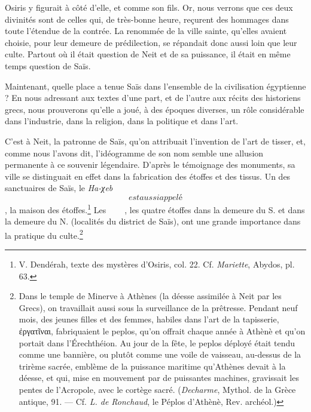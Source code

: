 \documentclass[letterpaper,twocolumn,openany,nodeprecatedcode]{dndbook}
\newcommand*\hieroAAAU{}
\newcommand*\hieroAAAX{}
\newcommand*\hieroAADR{}
\newcommand*\hieroAADV{\raisebox{0.5ex}{}}
\newcommand*\hieroAAFW{}
\newcommand*\hieroAAFX{}
\newcommand*\hieroAAFY{}
\newcommand*\hieroAAFZ{\raisebox{0.5ex}{}}
\newcommand*\hieroAAGA{}
\newcommand*\hieroAAGB{}
\begin{document}
Osiris y figurait à côté d'elle, et comme son fils. Or, nous verrons que ces deux divinités sont de celles qui, de très-bonne heure, reçurent des hommages dans toute l'étendue de la contrée. La renommée de la ville sainte, qu'elles avaient choisie, pour leur demeure de prédilection, se répandait donc aussi loin que leur culte. Partout où il était question de Neit et de sa puissance, il était en même temps question de Saïs.

Maintenant, quelle place a tenue Saïs dans l'ensemble de la civilisation égyptienne ? En nous adressant aux textes d'une part, et de l'autre aux récits des historiens grecs, nous prouverons qu'elle a joué, à des époques diverses, un rôle considérable dans l'industrie, dans la religion, dans la politique et dans l'art.

C'est à Neit, la patronne de Saïs, qu'on attribuait l'invention de l'art de tisser, et, comme nous l'avons dit, l'idéogramme de son nom semble une allusion permanente à ce souvenir légendaire. D'après le témoignage des monuments, sa ville se distinguait en effet dans la fabrication des étoffes et des tissus. Un des sanctuaires de Saïs, le \emph{Ha-χeb} $\hieroAAFW$ est aussi appelé $\hieroAAFX$, la maison des étoffes.\footnote{V. Dendérah, texte des mystères d'Osiris, col. 22. Cf. \emph{Mariette}, Abydos, pl. 63.} Les $\hieroAAFY\:\hieroAAFZ\:\hieroAAGA\allowbreak\:\hieroAADV\:\hieroAAAX\:\hieroAADR\allowbreak\:\hieroAAAU\:\hieroAAGB\:\hieroAAAU$, les quatre étoffes dans la demeure du S. et dans la demeure du N. (localités du district de Saïs), ont une grande importance dans la pratique du culte.\footnote{Dans le temple de Minerve à Athènes (la déesse assimilée à Neit par les Grecs), on travaillait aussi sous la surveillance de la prêtresse. Pendant neuf mois, des jeunes filles et des femmes, habiles dans l'art de la tapisserie, ἐργατῖναι, fabriquaient le peplos, qu'on offrait chaque année à Athènè et qu'on portait dans l'Érechthéion. Au jour de la fête, le peplos déployé était tendu comme une bannière, ou plutôt comme une voile de vaisseau, au-dessus de la trirème sacrée, emblème de la puissance maritime qu'Athènes devait à la déesse, et qui, mise en mouvement par de puissantes machines, gravissait les pentes de l'Acropole, avec le cortège sacré. (\emph{Decharme}, Mythol. de la Grèce antique, 91. --- Cf. \emph{L. de Ronchaud}, le Péplos d'Athènè, Rev. archéol.)}
\end{document}
